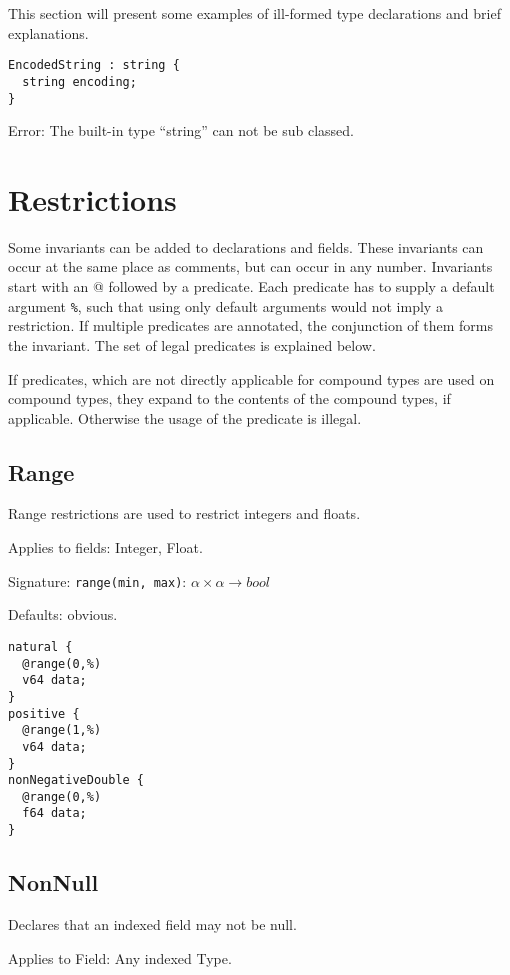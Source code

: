 \documentclass[a4paper,10pt]{article}
\begin{document}
This section will present some examples of ill-formed type declarations and brief explanations.

\begin{lstlisting}[label=stringExample,caption=Legal Super Types,language=skill]
EncodedString : string {
  string encoding;
}
\end{lstlisting}
Error: The built-in type ``string'' can not be sub classed.

\section{Restrictions}
Some invariants can be added to declarations and fields. These invariants can occur at the same place as comments, but can occur in any number. Invariants start with an \textsc{@} followed by a predicate. Each predicate has to supply a default argument \texttt{\%}, such that using only default arguments would not imply a restriction.
If multiple predicates are annotated, the conjunction of them forms the invariant.
The set of legal predicates is explained below.

If predicates, which are not directly applicable for compound types are used on compound types, they expand to the contents of the compound types, if applicable. Otherwise the usage of the predicate is illegal.

\subsection*{Range}
Range restrictions are used to restrict integers and floats.

Applies to fields: Integer, Float.

Signature: \verb/range(min, max)/: $\alpha \times \alpha → bool$

Defaults: obvious.

\begin{lstlisting}[label=rangeExample,caption=Examples,language=skill]
natural {
  @range(0,%)
  v64 data;
}
positive {
  @range(1,%)
  v64 data;
}
nonNegativeDouble {
  @range(0,%)
  f64 data;
}
\end{lstlisting}

\subsection*{NonNull}
Declares that an indexed field may not be null.

Applies to Field: Any indexed Type.
\end{document}
